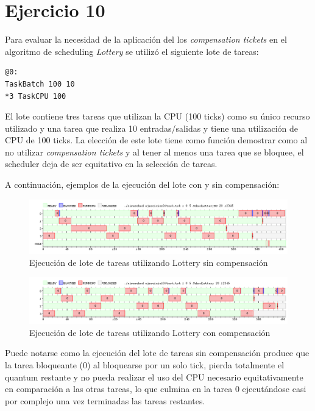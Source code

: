 \documentclass[a4paper,10pt,twoside]{article}
\begin{document}
\section{Ejercicio 10}

Para evaluar la necesidad de la aplicación del los \textit{compensation tickets} en el algoritmo de scheduling \textit{Lottery} se utilizó el siguiente lote de tareas:
\begin{verbatim}
@0:
TaskBatch 100 10
*3 TaskCPU 100
\end{verbatim}
El lote contiene tres tareas que utilizan la CPU (100 ticks) como su único recurso utilizado y una tarea que realiza 10 entradas/salidas y tiene una utilización de CPU de 100 ticks. La elección de este lote tiene como función demostrar como al no utilizar \textit{compensation tickets} y al tener al menos una tarea que se bloquee, el scheduler deja de ser equitativo en la selección de tareas.

A continuación, ejemplos de la ejecución del lote con y sin compensación:

\begin{figure}[H]
\centering
\includegraphics[width=175mm]{../ejercicio10/GraphSchedLotNC.png}
\caption{Ejecución de lote de tareas utilizando Lottery sin compensación}
\label{GraphSchedLotNC}
\end{figure}


\begin{figure}[H]
\centering
\includegraphics[width=175mm]{../ejercicio10/GraphSchedLot.png}
\caption{Ejecución de lote de tareas utilizando Lottery con compensación}
\label{GraphSchedLot}
\end{figure}

Puede notarse como la ejecución del lote de tareas sin compensación produce que la tarea bloqueante (0) al bloquearse por un solo tick, pierda totalmente el quantum restante y no pueda realizar el uso del CPU necesario equitativamente en comparación a las otras tareas, lo que culmina en la tarea 0 ejecutándose casi por complejo una vez terminadas las tareas restantes.
\end{document}

